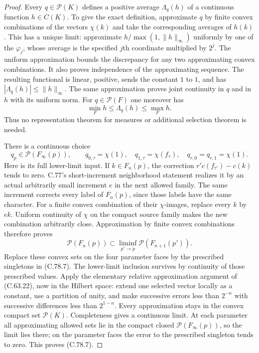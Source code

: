 \begin{proof}
Every $q\in\mathcal P(K)$ defines a positive
average $\Lambda_q(h)$ of a continuous function
$h\in C(K)$. To give the exact definition, approximate
$q$ by finite convex combinations of the vectors
$\chi(k)$ and take the corresponding averages of
$h(k)$. This has a unique limit: approximate
$h/\max(1,\|h\|_\infty)$ uniformly by one of the
$\varphi_j$, whose average is the specified
$j$th coordinate multiplied by $2^j$.
The uniform approximation bounds the discrepancy
for any two approximating convex combinations.
It also proves independence of the approximating
sequence. The resulting functional is linear,
positive, sends the constant $1$ to $1$, and has
$|\Lambda_q(h)|\leq\|h\|_\infty$.
The same approximation proves joint continuity
in $q$ and in $h$ with its uniform norm.
For $q\in\mathcal P(F)$ one moreover has
\[
              \min_F h\leq\Lambda_q(h)\leq\max_F h.
                                                               \tag{C.78.6}
\]
Thus no representation theorem for measures or
additional selection theorem is needed.

There is a continuous choice
\[
 q_p\in\mathcal P(F_\infty(p)),\qquad
 q_{0,\tau}=\chi(1),\quad q_{1,\tau}=\chi(f_\tau),\quad
 q_{r,0}=q_{r,1}=\chi(1).
                                                               \tag{C.78.7}
\]
Here is its full lower-limit input. If $k\in F_n(p)$,
the correction $r'c(f_{\tau'})-c(k)$ tends to zero.
C.77's short-increment neighborhood statement realizes
it by an actual arbitrarily small increment $e$ in
the next allowed family. The same increment corrects
every label of $F_n(p)$, since those labels have
the same character. For a finite convex combination
of their $\chi$-images, replace every $k$ by $ek$.
Uniform continuity of $\chi$ on the compact source
family makes the new combination arbitrarily close.
Approximation by finite convex combinations therefore
proves
\[
       \mathcal P(F_n(p))\subset
          \liminf_{p'\to p}\mathcal P(F_{n+1}(p')).
                                                               \tag{C.78.8}
\]
Replace these convex sets on the four parameter
faces by the prescribed singletons in (C.78.7).
The lower-limit inclusion survives by continuity
of those prescribed values. Apply the elementary
relative approximation argument of (C.63.22), now
in the Hilbert space: extend one selected vector
locally as a constant, use a partition of unity,
and make successive errors less than $2^{-n}$
with successive differences less than $2^{1-n}$.
Every approximation stays in the convex compact
set $\mathcal P(K)$. Completeness gives a continuous
limit. At each parameter all approximating allowed
sets lie in the compact closed
$\mathcal P(F_\infty(p))$, so the limit lies there;
on the parameter faces the error to the prescribed
singleton tends to zero. This proves (C.78.7).


\end{proof}
